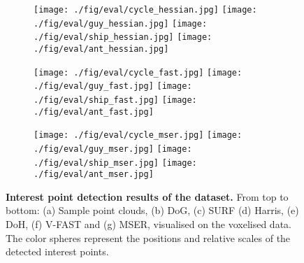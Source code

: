\begin{figure}[ht]
\begin{subfigure}[t]{1\linewidth}
		\label{fig/eval/mesh/hessian}	
		\makebox[0.15\linewidth]{\raisebox{0.07\linewidth}{(e) DoH}} 
		\texttt{[image: ./fig/eval/cycle\_hessian.jpg]} 
		\texttt{[image: ./fig/eval/guy\_hessian.jpg]} 
		\texttt{[image: ./fig/eval/ship\_hessian.jpg]}
		\texttt{[image: ./fig/eval/ant\_hessian.jpg]} 
	\end{subfigure}
	\begin{subfigure}[t]{1\linewidth} \centering 
		\label{fig/eval/mesh/fast}	
		\makebox[0.15\linewidth]{\raisebox{0.07\linewidth}{(f) VFAST}} 
		\texttt{[image: ./fig/eval/cycle\_fast.jpg]} 
		\texttt{[image: ./fig/eval/guy\_fast.jpg]} 
		\texttt{[image: ./fig/eval/ship\_fast.jpg]}
		\texttt{[image: ./fig/eval/ant\_fast.jpg]} 
	\end{subfigure}
	\begin{subfigure}[t]{1\linewidth} \centering 
		\label{fig/eval/mesh/mser}	
		\makebox[0.15\linewidth]{\raisebox{0.07\linewidth}{(g) MSER}} 
		\texttt{[image: ./fig/eval/cycle\_mser.jpg]} 
		\texttt{[image: ./fig/eval/guy\_mser.jpg]} 
		\texttt{[image: ./fig/eval/ship\_mser.jpg]}
		\texttt{[image: ./fig/eval/ant\_mser.jpg]} 
	\end{subfigure}
	\caption{\textbf{Interest point detection results of the \meshset dataset.} From top to bottom: (a) Sample point clouds, (b) DoG, (c) SURF (d) Harris, (e) DoH, (f) V-FAST and (g) MSER, visualised on the voxelised data. The color spheres represent the positions and relative scales of the detected interest points.}
	\label{fig/eval/mesh}
\end{figure}

